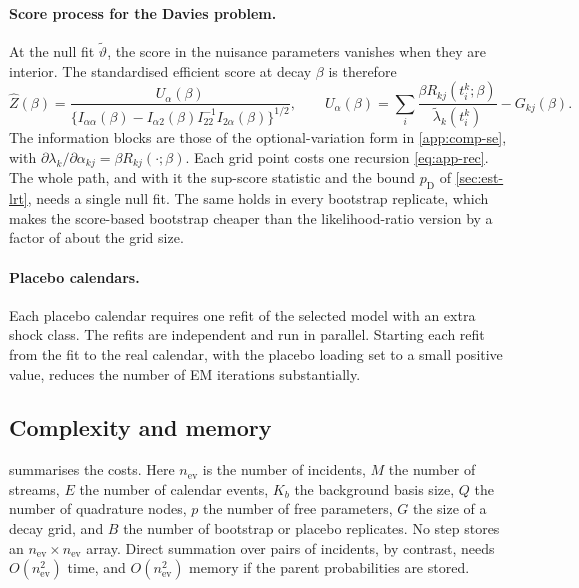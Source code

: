 \paragraph{Score process for the Davies problem.} At the null fit $\tilde\vartheta$, the
score in the nuisance parameters vanishes when they are interior. The standardised
efficient score at decay $\beta$ is therefore
\[
  \hat Z(\beta)=\frac{U_\alpha(\beta)}{\{I_{\alpha\alpha}(\beta)-I_{\alpha2}(\beta)I_{22}^{-1}I_{2\alpha}(\beta)\}^{1/2}},\qquad
  U_\alpha(\beta)=\sum_i\frac{\beta R_{kj}(t^k_i;\beta)}{\tilde\lambda_k(t^k_i)}-G_{kj}(\beta).
\]
The information blocks are those of the optional-variation form in
\cref{app:comp-se}, with $\partial\lambda_k/\partial\alpha_{kj}=\beta R_{kj}(\cdot;\beta)$.
Each grid point costs one recursion \eqref{eq:app-rec}. The whole path, and with it the
sup-score statistic and the bound $p_{\mathrm D}$ of \cref{sec:est-lrt}, needs a single
null fit. The same holds in every bootstrap replicate, which makes the score-based
bootstrap cheaper than the likelihood-ratio version by a factor of about the grid size.

\paragraph{Placebo calendars.} Each placebo calendar requires one refit of the selected
model with an extra shock class. The refits are independent and run in parallel. Starting
each refit from the fit to the real calendar, with the placebo loading set to a small
positive value, reduces the number of EM iterations substantially.

\subsection{Complexity and memory}\label{app:comp-cost}

 summarises the costs. Here $n_{\mathrm{ev}}$ is the number of incidents, $M$ the
number of streams, $E$ the number of calendar events, $K_b$ the background basis size,
$Q$ the number of quadrature nodes, $p$ the number of free parameters, $G$ the size of a
decay grid, and $B$ the number of bootstrap or placebo replicates. No step stores an
$n_{\mathrm{ev}}\times n_{\mathrm{ev}}$ array. Direct summation over pairs of incidents, by contrast,
needs $O(n_{\mathrm{ev}}^2)$ time, and $O(n_{\mathrm{ev}}^2)$ memory if the parent probabilities are
stored.

